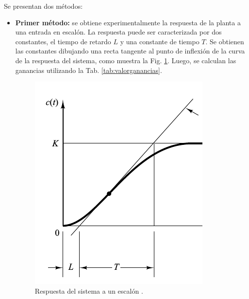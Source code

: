 Se presentan dos métodos:
\begin{itemize}
 \item \textbf{Primer método:} se obtiene experimentalmente la respuesta de la
planta a una entrada en escalón.
 La respuesta puede ser caracterizada por dos constantes, el tiempo de retardo
$L$ y una constante de tiempo $T$.
Se obtienen las constantes dibujando
una recta tangente al  punto de inflexión de la curva de la respuesta del
sistema, como muestra la Fig. \ref{fig:primermetodo}.
Luego, se calculan las ganancias utilizando la Tab. \ref{tab:valorganancias}.
\begin{figure}[ht]
 \centering
 \includegraphics[scale=0.5]{Cap4-ProgramacionPLC/images/primermetodo.png}
 \caption{Respuesta del sistema a un escalón \cite{bib:Ogata}.}
 \label{fig:primermetodo}
\end{figure}


\end{itemize}
